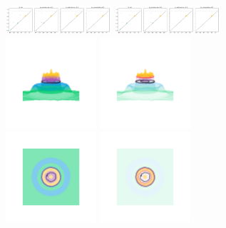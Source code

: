 \begin{figure}[htbp]
  \centering
  \includegraphics[trim=0 0 800 0, clip, width=0.35\textwidth]{scripts/figures/matching2/dgm-2.png}
  \includegraphics[trim=800 0 0 0, clip, width=0.35\textwidth]{scripts/figures/matching2/dgm-2.png}\\
  \includegraphics[trim=500 800 500 800, clip, width=0.3\textwidth]{scripts/figures/matching2/surf_side-2.png}
  \includegraphics[trim=500 800 500 800, clip, width=0.3\textwidth]{scripts/figures/matching2/surf_side-2_2.png}\\
  \includegraphics[trim=500 500 500 500, clip, width=0.3\textwidth]{scripts/figures/matching2/surf_top-2.png}
  \includegraphics[trim=500 500 500 500, clip, width=0.3\textwidth]{scripts/figures/matching2/surf_top-2_2.png}
\end{figure}

